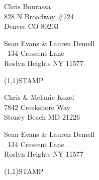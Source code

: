 \documentclass[12pt]{article}
\begin{document}
\begin{center} \begin{Huge} \vspace*{\fill}
Chris Bourassa\\
828 N Broadway \#724\\
Denver CO 80203\\
\vspace{\fill} \end{Huge} \end{center}

\clearpage

\begin{minipage}{.5\linewidth} \noindent
Sean Evans \& Lauren Demell\\\ 
134 Crescent Lane\\ 
Roslyn Heights NY 11577
\end{minipage}
\begin{minipage}{.5\linewidth \hspace{-.2in} \vspace{-.3in}}
\begin{flushright}
\framebox(1,1){STAMP}
\end{flushright}
\end{minipage}

\begin{center} \begin{Huge} \vspace*{\fill}
Chris \& Melanie Kozel\\
7842 Creekshore Way\\
Stoney Beach MD 21226\\
\vspace{\fill} \end{Huge} \end{center}

\clearpage

\begin{minipage}{.5\linewidth} \noindent
Sean Evans \& Lauren Demell\\\ 
134 Crescent Lane\\ 
Roslyn Heights NY 11577
\end{minipage}
\begin{minipage}{.5\linewidth \hspace{-.2in} \vspace{-.3in}}
\begin{flushright}
\framebox(1,1){STAMP}
\end{flushright}
\end{minipage}
\end{document}
